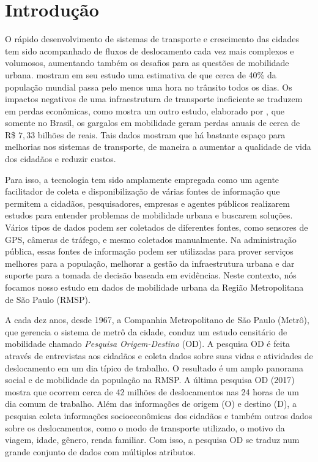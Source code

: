 \chapter{Introdução}
\label{cap:introducao}

O rápido  desenvolvimento de sistemas de transporte e crescimento das cidades
tem sido acompanhado de fluxos de deslocamento cada vez mais complexos e
volumosos, aumentando também os desafios para as questões de mobilidade urbana.
\citet{Zhang2011} mostram em seu estudo uma estimativa de que cerca de 40\% da
população mundial passa pelo menos uma hora no trânsito todos os dias.
Os impactos negativos de uma infraestrutura de transporte
ineficiente se traduzem em perdas econômicas, como mostra um outro estudo,
elaborado por \citet{ricardo:18}, que somente no Brasil, os gargalos em mobilidade geram
perdas anuais de cerca de R\$ $7,33$ bilhões de reais. Tais dados mostram que há
bastante espaço para melhorias nos sistemas de transporte, de
maneira a aumentar a qualidade de vida dos cidadãos e reduzir custos.

Para isso, a tecnologia tem sido amplamente empregada como um agente
facilitador de coleta e disponibilização de várias fontes de informação que
permitem a cidadãos, pesquisadores, empresas e agentes públicos realizarem
estudos para entender problemas de mobilidade urbana e buscarem soluções.
Vários tipos de dados podem ser coletados de diferentes fontes, como sensores
de GPS, câmeras de tráfego, e mesmo coletados manualmente. Na administração
pública, essas fontes de informação podem ser utilizadas para prover serviços
melhores para a população, melhorar a gestão da infraestrutura urbana e dar
suporte para a tomada de decisão baseada em evidências. Neste
contexto, nós focamos nosso estudo em dados de mobilidade urbana da Região
Metropolitana de S\~ao Paulo (RMSP).

A cada dez anos, desde 1967, a Companhia Metropolitano de São Paulo (Metrô),
que gerencia o sistema de metrô da cidade, conduz um estudo censitário de
mobilidade chamado \emph{Pesquisa Origem-Destino} (OD). A pesquisa OD é feita
através de entrevistas aos cidadãos e coleta dados sobre suas vidas e
atividades de deslocamento em um dia típico de trabalho. O resultado é um amplo
panorama social e de mobilidade da população na RMSP. A última pesquisa OD
(2017) mostra que ocorrem cerca de 42 milhões de deslocamentos nas 24 horas de
um dia comum de trabalho. Além das informações de origem (O) e destino (D), a
pesquisa coleta informações socioeconômicas dos cidadãos e também outros dados
sobre os deslocamentos, como o modo de transporte utilizado, o motivo da
viagem, idade, gênero, renda familiar. Com isso, a pesquisa OD se traduz num
grande conjunto de dados com múltiplos atributos.

